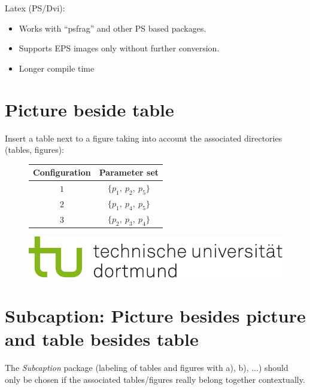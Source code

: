 Latex (PS/Dvi):
\begin{itemize}
	\item Works with "`psfrag"' and other PS based packages.
	\item Supports EPS images only without further conversion.
	\item Longer compile time
\end{itemize}


\section{Picture beside table}
Insert a table next to a figure taking into account the associated directories (tables, figures):
\begin{figure}[htbp]
%
	\begin{minipage}[t]{0.45\textwidth}
	\centering
		\begin{tabular}{cc}
		\toprule
		Configuration & Parameter set \\
		\midrule
		$1$ & $\{p_{1}, \: p_{2}, \: p_{5}\}$ \\
		$2$ & $\{p_{1}, \: p_{4}, \: p_{5}\}$ \\
		$3$ & $\{p_{2}, \: p_{3}, \: p_{4}\}$ \\
		\bottomrule
		\end{tabular}
	
	\label{tab:bsp2}
	\end{minipage}
%
	\begin{minipage}[t]{0.45\textwidth}
	\centering
	  \includegraphics[width=\textwidth]{images/logos/tud_logo_rgb}
	\end{minipage}
\end{figure}

\section{Subcaption: Picture besides picture and table besides table}

The \textit{Subcaption} package (labeling of tables and figures with a), b), ...) should only be chosen if the associated tables/figures really belong together contextually.


